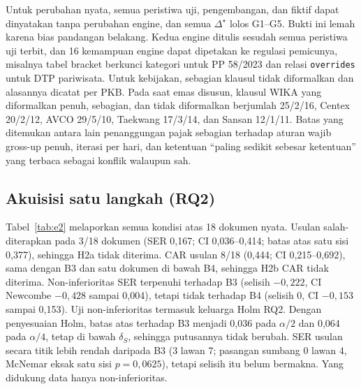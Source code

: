 \documentclass[conference]{IEEEtran}
\makeatletter
\DeclareRobustCommand{\en}[1]{{\usefont{\f@encoding}{\f@family}{\f@series}{it}#1\/}}
\newcommand{\emas}{\star}
\makeatother
\begin{document}
Untuk perubahan nyata, semua peristiwa uji, pengembangan, dan fiktif dapat dinyatakan tanpa perubahan \en{engine}, dan semua $\Delta^{\emas}$ lolos G1--G5. Bukti ini lemah karena bias pandangan belakang. Kedua \en{engine} ditulis sesudah semua peristiwa uji terbit, dan 16 kemampuan \en{engine} dapat dipetakan ke regulasi pemicunya, misalnya tabel \en{bracket} berkunci kategori untuk PP 58/2023 dan relasi \texttt{overrides} untuk DTP pariwisata. Untuk kebijakan, sebagian klausul tidak diformalkan dan alasannya dicatat per PKB. Pada saat emas disusun, klausul WIKA yang diformalkan penuh, sebagian, dan tidak diformalkan berjumlah 25/2/16, Centex 20/2/12, AVCO 29/5/10, Taekwang 17/3/14, dan Sansan 12/1/11. Batas yang ditemukan antara lain penanggungan pajak sebagian terhadap aturan wajib \en{gross-up} penuh, iterasi per hari, dan ketentuan ``paling sedikit sebesar ketentuan'' yang terbaca sebagai konflik walaupun sah.

\subsection{Akuisisi satu langkah (RQ2)}
Tabel~\ref{tab:e2} melaporkan semua kondisi atas 18 dokumen nyata. Usulan salah-diterapkan pada 3/18 dokumen (SER 0,167; CI 0,036--0,414; batas atas satu sisi 0,377), sehingga H2a tidak diterima. CAR usulan 8/18 (0,444; CI 0,215--0,692), sama dengan B3 dan satu dokumen di bawah B4, sehingga H2b CAR tidak diterima. Non-inferioritas SER terpenuhi terhadap B3 (selisih $-0{,}222$, CI Newcombe $-0{,}428$ sampai 0,004), tetapi tidak terhadap B4 (selisih 0, CI $-0{,}153$ sampai 0,153). Uji non-inferioritas termasuk keluarga Holm RQ2. Dengan penyesuaian Holm, batas atas terhadap B3 menjadi 0,036 pada $\alpha/2$ dan 0,064 pada $\alpha/4$, tetap di bawah $\delta_S$, sehingga putusannya tidak berubah. SER usulan secara titik lebih rendah daripada B3 (3 lawan 7; pasangan sumbang 0 lawan 4, McNemar eksak satu sisi $p = 0{,}0625$), tetapi selisih itu belum bermakna. Yang didukung data hanya non-inferioritas.
\end{document}
